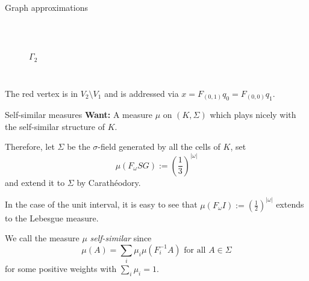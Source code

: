 \begin{frame}{Graph approximations}
\begin{example}
\begin{enumerate}
\begin{columns}[c]
\begin{figure}
\\
                \centering
                \(\Gamma_2 \)
            \end{figure}
        \end{columns}
    \end{enumerate}
    \end{example}
    The red vertex is in \(V_2 \setminus V_1 \) and is addressed via \(x = F_{(0, 1)}q_0 = F_{(0,0)}q_1 \).
\end{frame}

\begin{frame}{Self-similar measures}
    \textbf{Want:} A measure \(\mu \) on \((K, \Sigma) \) which plays nicely with the self-similar structure of \(K \).

    Therefore, let \(\Sigma \) be the \(\sigma \)-field generated by all the cells of \(K \), set
    \[ \mu(F_\omega SG) := \left(\frac{1}{3} \right)^{|\omega |} \]
    and extend it to \(\Sigma \) by Carathéodory.

    In the case of the unit interval, it is easy to see that \( \mu(F_\omega I) := \left( \frac{1}{2} \right)^{|\omega |} \) extends to the Lebesgue measure.

    \begin{definition}
        We call the measure \(\mu \) \textit{self-similar} since
        \[ \mu(A) = \sum_i \mu_i \mu(F_i^{-1} A) \text{ for all } A \in \Sigma \]
        for some positive weights with \(\sum_i \mu_i = 1 \).
    \end{definition}
\end{frame}

